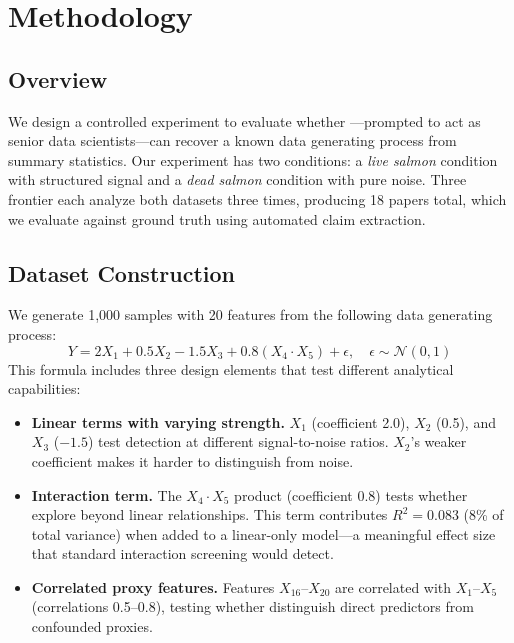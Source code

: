 \section{Methodology}
\label{sec:method}

\subsection{Overview}
\label{sec:method_overview}

We design a controlled experiment to evaluate whether \aiscientists---\llms prompted to act as senior data scientists---can recover a known data generating process from summary statistics.
Our experiment has two conditions: a \textit{live salmon} condition with structured signal and a \textit{dead salmon} condition with pure noise.
Three frontier \llms each analyze both datasets three times, producing 18 papers total, which we evaluate against ground truth using automated claim extraction.

\subsection{Dataset Construction}
\label{sec:datasets}

We generate 1{,}000 samples with 20 features from the following data generating process:
\begin{equation}
    Y = 2 X_1 + 0.5 X_2 - 1.5 X_3 + 0.8 (X_4 \cdot X_5) + \epsilon, \quad \epsilon \sim \mathcal{N}(0, 1)
    \label{eq:dgp}
\end{equation}
This formula includes three design elements that test different analytical capabilities:

\begin{itemize}[leftmargin=*,itemsep=2pt,topsep=2pt]
    \item {\bf Linear terms with varying strength.} $X_1$ (coefficient 2.0), $X_2$ (0.5), and $X_3$ ($-1.5$) test detection at different signal-to-noise ratios. $X_2$'s weaker coefficient makes it harder to distinguish from noise.
    \item {\bf Interaction term.} The $X_4 \cdot X_5$ product (coefficient 0.8) tests whether \aiscientists explore beyond linear relationships. This term contributes $R^2 = 0.083$ (8\% of total variance) when added to a linear-only model---a meaningful effect size that standard interaction screening would detect.
    \item {\bf Correlated proxy features.} Features $X_{16}$--$X_{20}$ are correlated with $X_1$--$X_5$ (correlations 0.5--0.8), testing whether \aiscientists distinguish direct predictors from confounded proxies.
\end{itemize}

